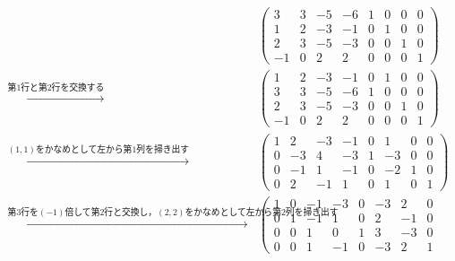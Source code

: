 \documentclass[a4paper,10pt,fleqn]{ltjsarticle}
\begin{document}
\begin{leftbar}
  \begin{align*}
                                                                            &
    \left(
    \begin{array}{cccc|cccc}
        3  & 3 & -5 & -6 & 1 & 0 & 0 & 0 \\
        1  & 2 & -3 & -1 & 0 & 1 & 0 & 0 \\
        2  & 3 & -5 & -3 & 0 & 0 & 1 & 0 \\
        -1 & 0 & 2  & 2  & 0 & 0 & 0 & 1
      \end{array}
    \right)                                                                   \\
    \xrightarrow{\text{第$1$行と第$2$行を交換する}}                                   &
    \left( \begin{array}{cccc|cccc}
               1  & 2 & -3 & -1 & 0 & 1 & 0 & 0 \\
               3  & 3 & -5 & -6 & 1 & 0 & 0 & 0 \\
               2  & 3 & -5 & -3 & 0 & 0 & 1 & 0 \\
               -1 & 0 & 2  & 2  & 0 & 0 & 0 & 1
             \end{array}
    \right)                                                                   \\
    \xrightarrow{\text{$(1,1)$をかなめとして左から第1列を掃き出す}}                          &
    \left( \begin{array}{cccc|cccc}
               1 & 2  & -3 & -1 & 0 & 1  & 0 & 0 \\
               0 & -3 & 4  & -3 & 1 & -3 & 0 & 0 \\
               0 & -1 & 1  & -1 & 0 & -2 & 1 & 0 \\
               0 & 2  & -1 & 1  & 0 & 1  & 0 & 1
             \end{array}
    \right)                                                                   \\
    \xrightarrow{\text{第$3$行を$(-1)$倍して第2行と交換し，$(2,2)$をかなめとして左から第$2$列を掃き出す}} &
    \left( \begin{array}{cccc|cccc}
               1 & 0 & -1 & -3 & 0 & -3 & 2  & 0 \\
               0 & 1 & -1 & 1  & 0 & 2  & -1 & 0 \\
               0 & 0 & 1  & 0  & 1 & 3  & -3 & 0 \\
               0 & 0 & 1  & -1 & 0 & -3 & 2  & 1

\end{array}
\end{align*}
\end{leftbar}
\end{document}
